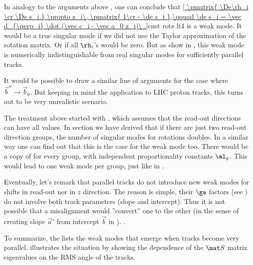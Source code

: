 In analogy to the arguments above , one can conclude that
\eqref{
\pmatrix{
\De\rh_i \cr
\De s_i
} \propto z_i\, \pmatrix{
1\cr
- \de s_i
},\qquad \de s_i = \vec d_{\perp_i} \dot (\vec c_i - \vec a_0 z_i)\ .}{cnst rotz lt4}
is a weak mode. It would be a true singular mode if we did not use the Taylor approximation of the rotation matrix. Or if all $\rh_i$'s would be zero. But as show in , this weak mode is numerically indistinguishable from real singular modes for sufficiently parallel tracks.

It would be possible to draw a similar line of arguments for the case where $\vec b^n\to \vec b_0$. But keeping in mind the application to LHC proton tracks, this turns out to be very unrealistic scenario.

The treatment above started with , which assumes that the read-out directions can have all values. In section  we have derived that if there are just two read-out direction groups, the number of singular modes for rotations doubles. In a similar way one can find out that this is the case for the weak mode  too. There would be a copy of  for every group, with independent proportionality constants $\al_g$. This would lead to one weak mode per group, just like in .

Eventually, let's remark that parallel tracks do not introduce new weak modes for shifts in read-out nor in $z$ direction. The reason is simple, their $\ga$ factors (see ) do not involve both track parameters (slope and intercept). Thus it is not possible that a misalignment would ''convert'' one to the other (in the sense of creating slope $\vec a'$ from intercept $\vec b$ in ). .

To summarize, the  lists the weak modes that emerge when tracks become very parallel.  illustrates the situation by showing the dependence of the $\mat S$ matrix eigenvalues on the RMS angle of the tracks.


